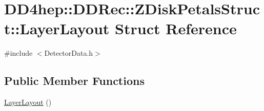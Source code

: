 \hypertarget{struct_d_d4hep_1_1_d_d_rec_1_1_z_disk_petals_struct_1_1_layer_layout}{}\section{D\+D4hep\+:\+:D\+D\+Rec\+:\+:Z\+Disk\+Petals\+Struct\+:\+:Layer\+Layout Struct Reference}
\label{struct_d_d4hep_1_1_d_d_rec_1_1_z_disk_petals_struct_1_1_layer_layout}


{\ttfamily \#include $<$Detector\+Data.\+h$>$}

\subsection*{Public Member Functions}
\begin{DoxyCompactItemize}
\item 
\hyperlink{struct_d_d4hep_1_1_d_d_rec_1_1_z_disk_petals_struct_1_1_layer_layout_ae927543c3f4f96d195e45e75db37b9b8}{Layer\+Layout} ()
\end{DoxyCompactItemize}
